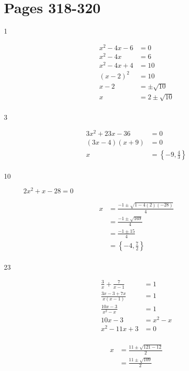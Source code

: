 \documentclass[fleqn,addpoints]{exam}
\begin{document}
\section{Pages 318-320}
\begin{description}

\item[1]
\begin{align*}
  x^2-4x-6 &= 0 \\
  x^2-4x &= 6 \\
  x^2-4x + 4 &= 10 \\
  (x-2)^2 &= 10 \\
  x-2 &= \pm \sqrt{10} \\
  x &= 2 \pm \sqrt{10} \\
\end{align*}

\item[3]
\begin{align*}
  3x^2+23x-36 &= 0 \\
  (3x-4)(x+9) &= 0 \\
 x &= \left \{ -9, \frac{4}{3} \right \} \\
\end{align*}

\item[10]
\( 2x^2+x-28 = 0 \)

\begin{align*}
  x &= \frac{-1 \pm \sqrt{1 - 4(2)(-28)}}{4} \\
    &= \frac{-1 \pm \sqrt{169}}{4} \\
    &= \frac{-1 \pm 15}{4} \\
    &= \left \{ -4, \frac{7}{2} \right \} \\
\end{align*}

\item[23]
\begin{align*}
  \frac{3}{x} + \frac{7}{x-1} &= 1 \\
  \frac{3x-3+7x}{x(x-1)} &= 1 \\
  \frac{10x-3}{x^2-x} &= 1 \\
  10x-3 &= x^2-x \\
  x^2 - 11x+3 &= 0 \\
\end{align*}

\begin{align*}
  x &= \frac{11 \pm \sqrt{121-12}}{2} \\
    &= \frac{11 \pm \sqrt{109}}{2} \\
\end{align*}


\end{description}
\end{document}
